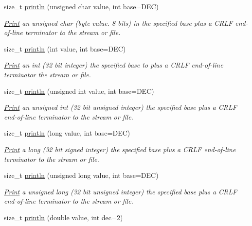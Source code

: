 \begin{DoxyCompactItemize}
size\+\_\+t \mbox{\hyperlink{class_print_a000b3fd5b723cb6c7db0d3231a9ef2f8}{println}} (unsigned char value, int base=D\+EC)
\begin{DoxyCompactList}\small\item\em \mbox{\hyperlink{class_print}{Print}} an unsigned char (byte value. 8 bits) in the specified base plus a C\+R\+LF end-\/of-\/line terminator to the stream or file. \end{DoxyCompactList}\item 
size\+\_\+t \mbox{\hyperlink{class_print_a82aa91bbd859f28a0a3b4869e5bfcadd}{println}} (int value, int base=D\+EC)
\begin{DoxyCompactList}\small\item\em \mbox{\hyperlink{class_print}{Print}} an int (32 bit integer) the specified base to plus a C\+R\+LF end-\/of-\/line terminator the stream or file. \end{DoxyCompactList}\item 
size\+\_\+t \mbox{\hyperlink{class_print_a2608232c1f10f654111ff447de16d60b}{println}} (unsigned int value, int base=D\+EC)
\begin{DoxyCompactList}\small\item\em \mbox{\hyperlink{class_print}{Print}} an unsigned int (32 bit unsigned integer) the specified base plus a C\+R\+LF end-\/of-\/line terminator to the stream or file. \end{DoxyCompactList}\item 
size\+\_\+t \mbox{\hyperlink{class_print_a82bbe59b28440c29e55ff3597eb45376}{println}} (long value, int base=D\+EC)
\begin{DoxyCompactList}\small\item\em \mbox{\hyperlink{class_print}{Print}} a long (32 bit signed integer) the specified base plus a C\+R\+LF end-\/of-\/line terminator to the stream or file. \end{DoxyCompactList}\item 
size\+\_\+t \mbox{\hyperlink{class_print_afa936d7e8dd329d9162f2cd28f42681e}{println}} (unsigned long value, int base=D\+EC)
\begin{DoxyCompactList}\small\item\em \mbox{\hyperlink{class_print}{Print}} a unsigned long (32 bit unsigned integer) the specified base plus a C\+R\+LF end-\/of-\/line terminator to the stream or file. \end{DoxyCompactList}\item 
size\+\_\+t \mbox{\hyperlink{class_print_a178b90baf9f74f0945f5c64aafec59ea}{println}} (double value, int dec=2)

\end{DoxyCompactItemize}
